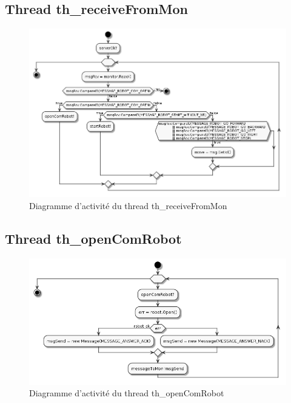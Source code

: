 \documentclass[11pt,a4paper]{paper}
\begin{document}
\subsection{Thread th\_receiveFromMon}

 \begin{figure}[htbp]
\begin{center}
\includegraphics[scale=0.4]{figures_pdf/activity/th_receiveFromMon}
\end{center}
\caption{Diagramme d'activité du thread th\_receiveFromMon}
\end{figure}
\FloatBarrier

\subsection{Thread th\_openComRobot}

 \begin{figure}[htbp]
\begin{center}
\includegraphics[scale=0.4]{figures_pdf/activity/th_openComRobot}
\end{center}
\caption{Diagramme d'activité du thread th\_openComRobot}
\end{figure}
\FloatBarrier
\end{document}
